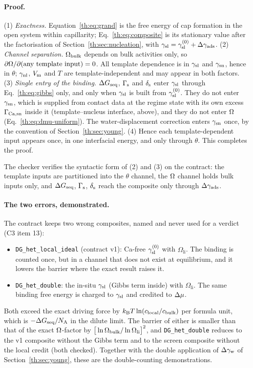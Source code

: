 \paragraph{Proof.} (1) \emph{Exactness.} Equation~\eqref{th:eq:grand} is the free energy of cap
formation in the open system within capillarity; Eq.~\eqref{th:eq:composite} is its stationary
value after the factorisation of Section~\ref{th:sec:nucleation}, with $\gamma_\mathrm{sl}=\gamma_\mathrm{sl}^{(0)}+\Delta\gamma_\mathrm{ads}$.
(2) \emph{Channel separation.} $\Omega_\mathrm{bulk}$ depends on bulk activities only, so
$\partial\Omega/\partial(\text{any template input})=0$. All template dependence is in $\gamma_\mathrm{sl}$ and $\gamma_\mathrm{sn}$,
hence in $\theta$; $\gamma_\mathrm{nl}$, $V_\mathrm{m}$ and $T$ are template-independent and may appear in both factors.
(3) \emph{Single entry of the binding.} $\Delta G_\mathrm{seq}$, $\Gamma_\mathrm{s}$ and $\delta_\mathrm{s}$ enter $\gamma_\mathrm{sl}$ through
Eq.~\eqref{th:eq:gibbs} only, and only when $\gamma_\mathrm{sl}$ is built from $\gamma_\mathrm{sl}^{(0)}$. They do not enter
$\gamma_\mathrm{sn}$, which is supplied from contact data at the regime state with its own excess $\Gamma_\mathrm{Ca,sn}$ inside
it (template--nucleus interface, above), and they do not enter $\Omega$
(Eq.~\eqref{th:eq:dmu-uniform}). The water-displacement correction enters $\gamma_\mathrm{sn}$ once, by the
convention of Section~\ref{th:sec:young}. (4) Hence each template-dependent input appears once,
in one interfacial energy, and only through $\theta$. This completes the proof.

\noindent The checker verifies the syntactic form of (2) and (3) on the contract: the template
inputs are partitioned into the $\theta$ channel, the $\Omega$ channel holds bulk inputs only, and
$\Delta G_\mathrm{seq}$, $\Gamma_\mathrm{s}$, $\delta_\mathrm{s}$ reach the composite only through $\Delta\gamma_\mathrm{ads}$.

\paragraph{The two errors, demonstrated.} The contract keeps two wrong composites, named and never
used for a verdict (C3 item 13):
\begin{itemize}
\item \texttt{DG\_het\_local\_ideal} (contract v1): Ca-free $\gamma_\mathrm{sl}^{(0)}$ with $\Omega_\mathrm{li}$. The
binding is counted once, but in a channel that does not exist at equilibrium, and it lowers the
barrier where the exact result raises it.
\item \texttt{DG\_het\_double}: the in-situ $\gamma_\mathrm{sl}$ (Gibbs term inside) with $\Omega_\mathrm{li}$. The
same binding free energy is charged to $\gamma_\mathrm{sl}$ and credited to $\Delta\mu$.
\end{itemize}
Both exceed the exact driving force by $k_\mathrm{B} T\ln(c_\mathrm{local}/c_\mathrm{bulk})$ per formula unit, which is
$-\Delta G_\mathrm{seq}/N_\mathrm{A}$ in the dilute limit. The barrier of either is smaller than that of the exact
$\Omega$-factor by $\big[\ln\Omega_\mathrm{bulk}/\ln\Omega_\mathrm{li}\big]^{2}$, and \texttt{DG\_het\_double} reduces to
the v1 composite without the Gibbs term and to the screen composite without the local credit
(both checked). Together with the double application of $\Delta\gamma_\mathrm{w}$ of Section~\ref{th:sec:young},
these are the double-counting demonstrations.

